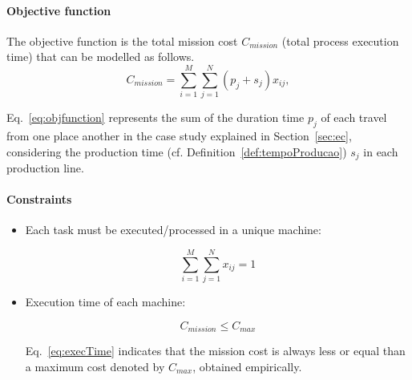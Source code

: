 \documentclass[conference,harvard,brazil,english]{sbatex}
\begin{document}
\paragraph{Objective function}

The objective function is the total mission cost $C_{mission}$ (total process execution time) that can be modelled as follows.
%
\begin{equation}
\label{eq:objfunction}
C_{mission}=\sum_{i=1}^{M}{\sum_{j=1}^{N}{
 (p_j+s_j)x_{ij}}},
\end{equation}

Eq.~\eqref{eq:objfunction} represents the sum of the duration time $p_j$ of each travel from one place another in the case study explained in Section~\ref{sec:ec}, considering the production time (cf. Definition~\ref{def:tempoProducao}) $s_j$ in each production line.



\paragraph{Constraints}

\begin{itemize}
\item Each task must be executed/processed in a unique machine:

\begin{equation}
\label{eq:unicity}
\sum_{i=1}^{M}{\sum_{j=1}^{N}{x_{ij}}}=1
\end{equation}

\item Execution time of each machine:

\begin{equation}
\label{eq:execTime}
C_{mission}\leq C_{max}
\end{equation}

Eq.~\eqref{eq:execTime} indicates that the mission cost is always less or equal than a maximum cost denoted by $C_{max}$, obtained empirically.
\end{itemize}

\end{document}
